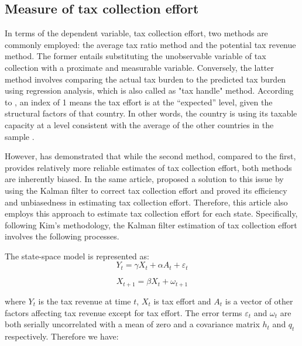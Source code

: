 \subsection{Measure of tax collection effort}

In terms of the dependent variable, tax collection effort, two methods are commonly employed: the average tax ratio method and the potential tax revenue method\parencite*{tait1978two,tanzi1981taxation,tanzi1983quantitative}. The former entails substituting the unobservable variable of tax collection with a proximate and measurable variable. Conversely, the latter method involves comparing the actual tax burden to the predicted tax burden using regression analysis, which is also called as "tax handle" method. According to \textcite{bahl1971regression}, an index of 1 means the tax effort is at the “expected” level, given the structural factors of that country. In other words, the country is using its taxable capacity at a level consistent with the average of the other countries in the sample \parencite{mertens2003measuring}.

However, \textcite{doi:10.1080/13504850500425345} has demonstrated that while the second method, compared to the first, provides relatively more reliable estimates of tax collection effort, both methods are inherently biased. In the same article, \textcite{doi:10.1080/13504850500425345} proposed a solution to this issue by using the Kalman filter to correct tax collection effort and proved its efficiency and unbiasedness in estimating tax collection effort. Therefore, this article also employs this approach to estimate tax collection effort for each state. Specifically, following Kim's methodology, the Kalman filter estimation of tax collection effort involves the following processes.

The state-space model is represented as:
\begin{equation}
    Y_t=\gamma X_t+\alpha A_t+\varepsilon_t \label{statespace1}
\end{equation}

\begin{equation}
    X_{t+1}=\beta X_t+\omega_{t+1}\label{statespace2}
\end{equation}

where $Y_t$ is the tax revenue at time $t$, $X_t$ is tax effort and $A_t$ is a vector of other factors affecting tax revenue except for tax effort. The error terms $\varepsilon_t$ and $\omega_{t}$ are both serially uncorrelated with a mean of zero and a covariance matrix $h_t$ and $q_t$ respectively. Therefore we have:

